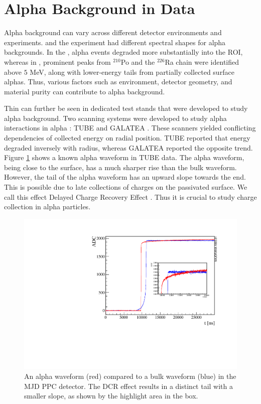 \section{Alpha Background in Data}

Alpha background can vary across different detector environments and experiments. {\MJD} and the \Gerda experiment had different  spectral shapes for alpha backgrounds. In the {\MJD}, alpha events degraded more substantially into the ROI, whereas in \Gerda, prominent peaks from $^{210}$Po and the $^{226}$Ra chain were identified above $5$ MeV, along with lower-energy tails from partially collected surface alphas. Thus, various factors such as environment, detector geometry, and material purity can contribute to alpha background.


Thin can further be seen in dedicated test stands that were developed to study alpha background. Two scanning systems were developed to study alpha interactions in alpha : TUBE \cite{TUBE_paper} and GALATEA \cite{galatea_paper}. These scanners yielded conflicting dependencies of collected energy on radial position. TUBE reported that energy degraded inversely with radius, whereas GALATEA reported the opposite trend. Figure \ref{fig:dcr_waveform} shows a known alpha waveform in TUBE data. The alpha waveform, being close to the surface, has a much sharper rise than the bulk waveform. However, the tail of the alpha waveform has an upward slope towards the end. This is possible due to late collections of charges on the passivated surface. We call this effect Delayed Charge Recovery Effect \cite{Gruszko:2017kfx}. Thus it is crucial to study charge collection in alpha particles.

\begin{figure}[!htb]
\centering
\includegraphics[width=0.8\linewidth]{ch3/figs/dcr_waveform.pdf}
\caption{An alpha waveform (red) compared to a bulk waveform (blue) in the MJD PPC detector. The DCR effect results in a distinct tail with a smaller slope, as shown by the highlight area in the box.\cite{TUBE_paper}}
\label{fig:dcr_waveform}
\end{figure}

